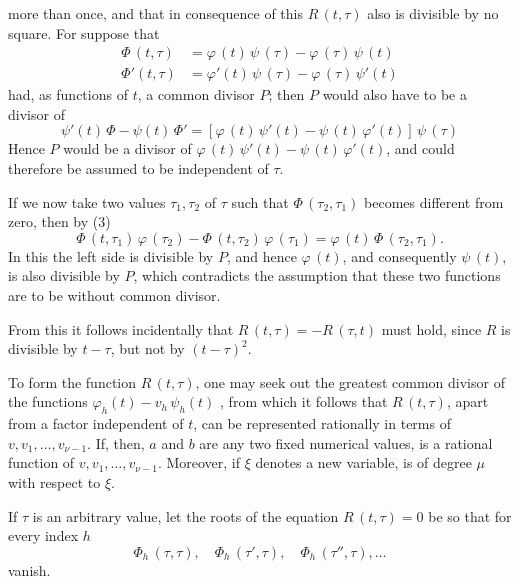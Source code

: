 
more than once, and that in consequence of this $R\,(t, \tau)$ also is
divisible by no square. For suppose that
\[
\begin{aligned}
\varPhi\,(t,\tau) &= \varphi\,(t)\,\psi\,(\tau) - \varphi\,(\tau)\,\psi\,(t) \\
\varPhi'(t,\tau) &= \varphi'(t)\,\psi\,(\tau) - \varphi\,(\tau)\,\psi'(t)
\end{aligned}
\]
had, as functions of $t$, a common divisor $P$; then $P$ would also
have to be a divisor of
\[
\psi'(t)\,\varPhi - \psi(t)\,\varPhi' = [\varphi\,(t)\,\psi'(t) - \psi\,(t)\,\varphi'(t)]\,\psi\,(\tau)
\]
Hence $P$ would be a divisor of $\varphi\,(t)\,\psi'(t) - \psi\,(t)\,\varphi'(t)$, and
could therefore be assumed to be independent of $\tau$.

If we now take two values $\tau_1, \tau_2$ of $\tau$ such that
$\varPhi\,(\tau_2, \tau_1)$ becomes different from zero, then by (3)
\[
\varPhi\,(t,\tau_1)\,\varphi\,(\tau_2) - \varPhi\,(t,\tau_2)\,\varphi\,(\tau_1) = \varphi\,(t)\,\varPhi\,(\tau_2,\tau_1).
\]
In this the left side is divisible by $P$, and hence
$\varphi\,(t)$, and consequently $\psi\,(t)$, is also divisible by $P$, which contradicts
 the assumption that these two functions are to be without
 common divisor.

From this it follows incidentally that $R\,(t,\tau) = -R\,(\tau,t)$ must hold,
since $R$ is divisible by $t - \tau$, but not by $(t-\tau)^2$.

To form the function $R\,(t,\tau)$, one may seek out the greatest
common divisor of the functions $\varphi_h(t) - v_h\,\psi_h(t)$
, from which it follows that $R\,(t,\tau)$, apart from a factor
independent of $t$, can be represented rationally in terms of $v, v_1, \ldots, v_{\nu-1}$.
If, then, $a$ and $b$ are any two fixed numerical
values,
is a rational function of $v, v_1, \ldots, v_{\nu-1}$. Moreover, if $\xi$
denotes a new variable,
is of degree $\mu$ with respect to $\xi$.

If $\tau$ is an arbitrary value, let the roots of the
equation $R\,(t,\tau) = 0$ be
so that for every index $h$
\[
\varPhi_h\,(\tau, \tau), \quad \varPhi_h\,(\tau', \tau), \quad \varPhi_h\,(\tau'', \tau), \ldots
\]
vanish.
